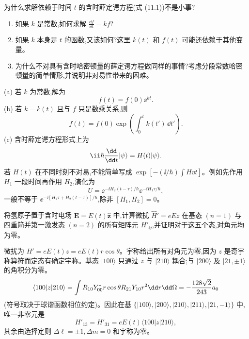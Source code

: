 \begin{question}
为什么求解依赖于时间 $t$ 的含时薛定谔方程(式 (11.1))不是小事?
\begin{enumerate}
\item 如果 $k$ 是常数,如何求解 $\frac{\dd f}{\dd t}=kf$?
\item 如果 $k$ 本身是 $t$ 的函数,又该如何?这里 $k(t)$ 和 $f(t)$ 可能还依赖于其他变量。
\item 为什么不对具有含时哈密顿量的薛定谔方程做同样的事情?考虑分段常数哈密顿量的简单情形,并说明非对易性带来的困难。
\end{enumerate}

\par\smallskip
{}

\begin{solution}
(a) 若 $k$ 为常数,解为
\[
f(t)=f(0)\ee^{kt}.
\]
(b) 若 $k=k(t)$ 且与 $f$ 只是数乘关系,则
\[
f(t)=f(0)\exp\left(\int_0^t k(t')\,\dd t'\right).
\]
(c) 含时薛定谔方程形式上为
\[
\ii\hbar{\dd\over\dd t}|\psi\rangle=H(t)|\psi\rangle.
\]
若 $H(t)$ 在不同时刻不对易,不能简单写成 $\exp[-(\ii/\hbar)\int H\dd t]$。例如先作用 $H_1$ 一段时间再作用 $H_2$,演化为
\[
U=\ee^{-\ii H_2(t-\tau)/\hbar}\ee^{-\ii H_1\tau/\hbar},
\]
一般不等于 $\ee^{-\ii[H_1\tau+H_2(t-\tau)]/\hbar}$,除非 $[H_1,H_2]=0$。
\end{solution}
\end{question}

\begin{question}
将氢原子置于含时电场 $\mathbf E=E(t)\hat{\mathbf z}$ 中,计算微扰 $\hat H'=eEz$ 在基态 $(n=1)$ 与四重简并第一激发态 $(n=2)$ 的所有矩阵元 $H'_{\ii j}$,并证明对于这五个态,对角元均为零。
\begin{solution}
微扰为 $H'=eE(t)z=eE(t)r\cos\theta$。宇称给出所有对角元为零,因为 $z$ 是奇宇称算符而定态有确定宇称。基态 $|100\rangle$ 只通过 $z$ 与 $|210\rangle$ 耦合;与 $|200\rangle$ 及 $|21,\pm1\rangle$ 的角积分为零。
\[
\langle100|z|210\rangle=\int R_{10}Y_{00}^*r\cos\theta R_{21}Y_{10}r^2\dd r\dd\Omega
=-{128\sqrt2\over243}a_0
\]
(符号取决于球谐函数相位约定)。因此在基 $\{|100\rangle,|200\rangle,|210\rangle,|211\rangle,|21,-1\rangle\}$ 中,唯一非零元是
\[
H'_{13}=H'_{31}=eE(t)\langle100|z|210\rangle,
\]
其余由选择定则 $\Delta\ell=\pm1,\Delta m=0$ 和宇称为零。
\end{solution}
\end{question}

